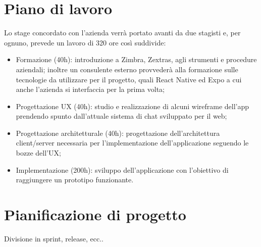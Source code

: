 \section{Piano di lavoro}
Lo stage concordato con l'azienda verrà portato avanti da due stagisti e, per ognuno, prevede un lavoro di 320 ore così suddivide:
\begin{itemize}
	\item Formazione (40h): introduzione a Zimbra, Zextras, agli strumenti e procedure aziendali; inoltre un consulente esterno provvederà alla formazione sulle tecnologie da utilizzare per il progetto, quali React Native ed Expo a cui anche l'azienda si interfaccia per la prima volta;
	\item  Progettazione UX (40h): studio e realizzazione di alcuni wireframe dell'app prendendo spunto dall’attuale sistema di chat sviluppato per il web;
	\item Progettazione architetturale (40h): progettazione dell’architettura client/server necessaria per l’implementazione dell'applicazione seguendo le bozze dell’UX;
	\item Implementazione (200h): sviluppo dell’applicazione con l’obiettivo di raggiungere un
	prototipo funzionante.
	
\end{itemize}

\section{Pianificazione di progetto}
Divisione in sprint, release, ecc..



